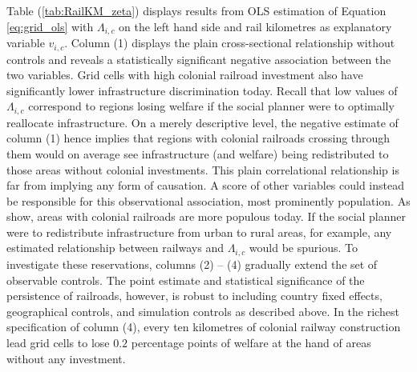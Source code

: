 \documentclass[11pt, oneside]{article}   	%
\let\oldref\ref
\renewcommand{\ref}[1]{(\oldref{#1})}
\begin{document}
Table \ref{tab:RailKM_zeta} displays results from OLS estimation of Equation \eqref{eq:grid_ols} with $\Lambda_{i,c}$ on the left hand side and rail kilometres as explanatory variable $v_{i,c}$. Column (1) displays the plain cross-sectional relationship without controls and reveals a statistically significant negative association between the two variables. Grid cells with high colonial railroad investment also have significantly lower infrastructure discrimination today. Recall that low values of $\Lambda_{i,c}$ correspond to regions losing welfare if the social planner were to optimally reallocate infrastructure. On a merely descriptive level, the negative estimate of column (1) hence implies that regions with colonial railroads crossing through them would on average see infrastructure (and welfare) being redistributed to those areas without colonial investments. This plain correlational relationship is far from implying any form of causation. A score of other variables could instead be responsible for this observational association, most prominently population. As \citeauthor{jedwab_permanent_2016} show, areas with colonial railroads are more populous today. If the social planner were to redistribute infrastructure from urban to rural areas, for example, any estimated relationship between railways and $\Lambda_{i,c}$ would be spurious. To investigate these reservations, columns (2) -- (4) gradually extend the set of observable controls. The point estimate and statistical significance of the persistence of railroads, however, is robust to including country fixed effects, geographical controls, and simulation controls as described above. In the richest specification of column (4), every ten kilometres of colonial railway construction lead grid cells to lose $0.2$ percentage points of welfare at the hand of areas without any investment.
\end{document}
